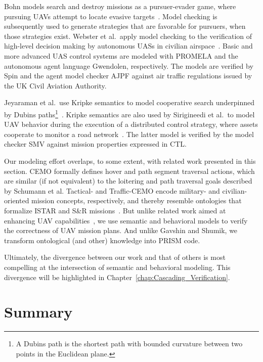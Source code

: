 Bohn models search and destroy missions as a pursuer-evader game, where pursuing UAVs attempt to locate evasive targets~\cite{Bohn_2007}. Model checking is subsequently used to generate strategies that are favorable for pursuers, when those strategies exist. Webster et al.\ apply model checking to the verification of high-level decision making by autonomous UASs in civilian airspace~\cite{Webster_2011}. Basic and more advanced UAS control systems are modeled with PROMELA and the autonomous agent language Gwendolen, respectively. The models are verified by Spin and the agent model checker AJPF against air traffic regulations issued by the UK Civil Aviation Authority.

Jeyaraman et al.\ use Kripke semantics to model cooperative search underpinned by Dubins paths\footnote{A Dubins path is the shortest path with bounded curvature between two points in the Euclidean plane.}~\cite{Jeyaraman_2005}. Kripke semantics are also used by Sirigineedi et al.\ to model UAV behavior during the execution of a distributed control strategy, where assets cooperate to monitor a road network~\cite{Sirigineedi_2011}. The latter model is verified by the model checker SMV against mission properties expressed in CTL\@.

Our modeling effort overlaps, to some extent, with related work presented in this section. CEMO formally defines hover and path segment traversal actions, which are similar (if not equivalent) to the loitering and path traversal goals described by Schumann et al. Tactical- and Traffic-CEMO encode military- and civilian-oriented mission concepts, respectively, and thereby resemble ontologies that formalize ISTAR and S\&R missions~\cite{De_Mel_2013,Preece_2008,Schlenoff_2005}. But unlike related work aimed at enhancing UAV capabilities~\cite{Schlenoff_2003,Bohn_2007}, we use semantic and behavioral models to verify the correctness of UAV mission plans. And unlike Gavshin and Shumik, we transform ontological (and other) knowledge into PRISM code.

Ultimately, the divergence between our work and that of others is most compelling at the intersection of semantic and behavioral modeling. This divergence will be highlighted in Chapter~\ref{chap:Cascading_Verification}.

\section{Summary}
\label{sec:Domain_Modeling_Summary}

